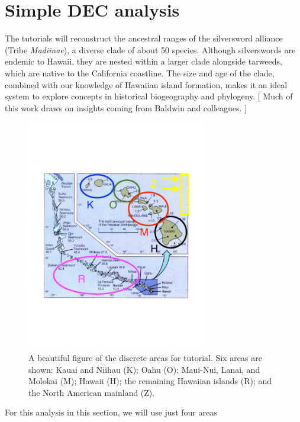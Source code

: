 

\section{Simple DEC analysis}


The tutorials will reconstruct the ancestral ranges of the silversword alliance (Tribe {\it Madiinae}), a diverse clade of about 50 species.
Although silverswords are endemic to Hawaii, they are nested within a larger clade alongside tarweeds, which are native to the California coastline.
The size and age of the clade, combined with our knowledge of Hawaiian island formation, makes it an ideal system to explore concepts in historical biogeography and phylogeny.
[ Much of this work draws on insights coming from Baldwin and colleagues. ]
 
\begin{figure}[!ht]
\centering
\includegraphics[width=0.7\textwidth]{figures/fig_hawaii_areas.pdf}
\caption{A beautiful figure of the discrete areas for tutorial. Six areas are shown: Kauai and Niihau (K); Oahu (O); Maui-Nui, Lanai, and Molokai (M); Hawaii (H); the remaining Hawaiian islands (R); and the North American mainland (Z).}
\end{figure}
 
For this analysis in this section, we will use just four areas

